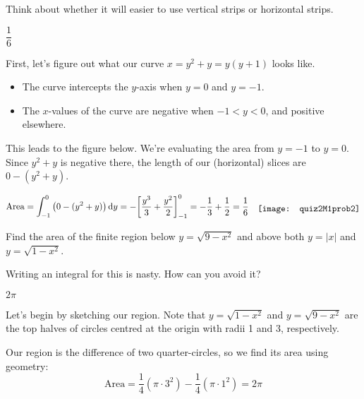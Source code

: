\begin{hint}
Think about whether it will easier to use vertical strips or horizontal strips.
\end{hint}

\begin{answer}
$\dfrac{1}{6}$
\end{answer}

\begin{solution}
First, let's figure out what our curve $x=y^2+y=y(y+1)$ looks like.
\begin{itemize}
\item The curve intercepts the $y$-axis when $y=0$ and $y=-1$.
\item The $x$-values of the curve are negative when $-1<y<0$, and  positive elsewhere.
\end{itemize}
 This leads to the figure below. We're evaluating the area from $y=-1$ to $y=0$. Since $y^2+y$ is negative there, the length of our (horizontal) slices are $0-(y^2+y)$.

\vspace{0.4in}
\begin{align*}
\text{Area}=\int_{-1}^0\big(0-(y^2+y)\big)\,\dee{y} = -\bigg[\frac{y^3}{3}+\frac{y^2}{2}\bigg]_{-1}^0
=-\frac13+\frac12
=\frac{1}{6}\quad
\smash{\raisebox{-0.33\height}{\texttt{[image: quiz2M1prob2]}}}
\end{align*}
\vspace{0.2in}

\end{solution}

\begin{question}
Find the area of the finite region  below $y=\sqrt{9-x^2}$ and above both
 $y=|x|$ and $y=\sqrt{1-x^2}$.
\end{question}
\begin{hint}
Writing an integral for this is nasty. How can you avoid it?
\end{hint}
\begin{answer}
$2\pi$
\end{answer}
\begin{solution}
Let's begin by sketching our region. Note that $y=\sqrt{1-x^2}$ and $y=\sqrt{9-x^2}$ are the top halves of circles centred at the origin with radii 1 and 3, respectively.
\begin{center}
\end{center}
Our region is the difference of two quarter-circles, so we find its area using geometry:
\[\mbox{Area}=\frac{1}{4}\left(\pi\cdot 3^2\right)-\frac{1}{4}\left(\pi\cdot 1^2\right)=2\pi\]
\end{solution}

